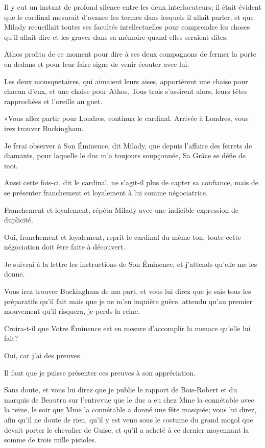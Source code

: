 Il y eut un instant de profond silence entre les deux interlocuteurs; il était évident que le cardinal mesurait d'avance les termes dans lesquels il allait parler, et que Milady recueillait toutes ses facultés intellectuelles pour comprendre les choses qu'il allait dire et les graver dans sa mémoire quand elles seraient dites. 

Athos profita de ce moment pour dire à ses deux compagnons de fermer la porte en dedans et pour leur faire signe de venir écouter avec lui. 

Les deux mousquetaires, qui aimaient leurs aises, apportèrent une chaise pour chacun d'eux, et une chaise pour Athos. Tous trois s'assirent alors, leurs têtes rapprochées et l'oreille au guet. 

«Vous allez partir pour Londres, continua le cardinal. Arrivée à Londres, vous irez trouver Buckingham. 

\speak  Je ferai observer à Son Éminence, dit Milady, que depuis l'affaire des ferrets de diamants, pour laquelle le duc m'a toujours soupçonnée, Sa Grâce se défie de moi. 

\speak  Aussi cette fois-ci, dit le cardinal, ne s'agit-il plus de capter sa confiance, mais de se présenter franchement et loyalement à lui comme négociatrice. 

\speak  Franchement et loyalement, répéta Milady avec une indicible expression de duplicité. 

\speak  Oui, franchement et loyalement, reprit le cardinal du même ton; toute cette négociation doit être faite à découvert. 

\speak  Je suivrai à la lettre les instructions de Son Éminence, et j'attends qu'elle me les donne. 

\speak  Vous irez trouver Buckingham de ma part, et vous lui direz que je sais tous les préparatifs qu'il fait mais que je ne m'en inquiète guère, attendu qu'au premier mouvement qu'il risquera, je perds la reine. 

\speak  Croira-t-il que Votre Éminence est en mesure d'accomplir la menace qu'elle lui fait? 

\speak  Oui, car j'ai des preuves. 

\speak  Il faut que je puisse présenter ces preuves à son appréciation. 

\speak  Sans doute, et vous lui direz que je publie le rapport de Bois-Robert et du marquis de Beautru sur l'entrevue que le duc a eu chez Mme la connétable avec la reine, le soir que Mme la connétable a donné une fête masquée; vous lui direz, afin qu'il ne doute de rien, qu'il y est venu sous le costume du grand mogol que devait porter le chevalier de Guise, et qu'il a acheté à ce dernier moyennant la somme de trois mille pistoles. 

